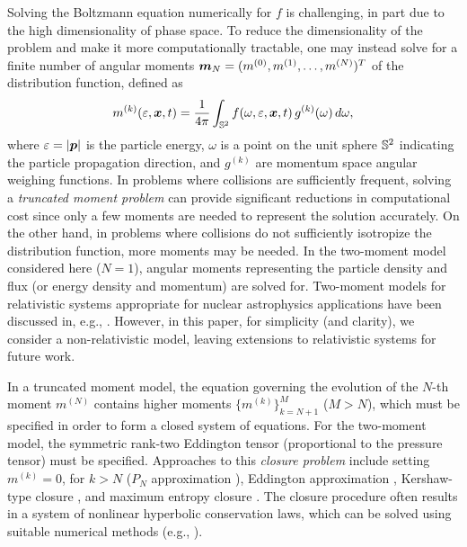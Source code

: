Solving the Boltzmann equation numerically for $f$ is challenging, in part due to the high dimensionality of phase space.  
To reduce the dimensionality of the problem and make it more computationally tractable, one may instead solve for a finite number of angular moments $\boldsymbol{m}_{N}=(m^{(0)},m^{(1)},\ldots,m^{(N)})^{T}$ of the distribution function, defined as
\begin{equation}
  m^{(k)}(\varepsilon,\boldsymbol{x},t)=\frac{1}{4\pi}\int_{\mathbb{S}^{2}}f(\omega,\varepsilon,\boldsymbol{x},t)\,g^{(k)}(\omega)\,d\omega,
\end{equation}
where $\varepsilon=|\boldsymbol{p}|$ is the particle energy, $\omega$ is a point on the unit sphere $\mathbb{S}^{2}$ indicating the particle propagation direction, and $g^{(k)}$ are momentum space angular weighing functions.  
In problems where collisions are sufficiently frequent, solving a \emph{truncated moment problem} can provide significant reductions in computational cost since only a few moments are needed to represent the solution accurately.  
On the other hand, in problems where collisions do not sufficiently isotropize the distribution function, more moments may be needed.  
In the two-moment model considered here ($N=1$), angular moments representing the particle density and flux (or energy density and momentum) are solved for.  
Two-moment models for relativistic systems appropriate for nuclear astrophysics applications have been discussed in, e.g., \cite{lindquist_1966,andersonSpiegel_1972,thorne_1981,shibata_etal_2011,cardall_etal_2013a}.  
However, in this paper, for simplicity (and clarity), we consider a non-relativistic model, leaving extensions to relativistic systems for future work.  

In a truncated moment model, the equation governing the evolution of the $N$-th moment $m^{(N)}$ contains higher moments $\{m^{(k)}\}_{k=N+1}^{M}$ ($M>N$), which must be specified in order to form a closed system of equations.  
For the two-moment model, the symmetric rank-two Eddington tensor (proportional to the pressure tensor) must be specified.  
Approaches to this \emph{closure problem} include setting $m^{(k)}=0$, for $k>N$ ($P_N$ approximation \cite{brunnerHolloway_2005}), Eddington approximation \cite{mihalasMihalas_1999}, Kershaw-type closure \cite{kershaw_1976}, and maximum entropy closure \cite{minerbo_1978,cernohorskyBludman_1994}.  
The closure procedure often results in a system of nonlinear hyperbolic conservation laws, which can be solved using suitable numerical methods (e.g., \cite{leveque_1992}).  

